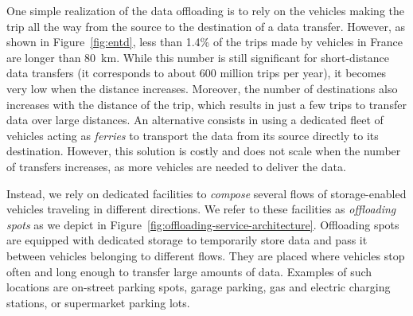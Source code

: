 One simple realization of the data offloading is to rely on the vehicles making the trip all the way from the source to the destination of a data transfer. However, as shown in Figure~\ref{fig:entd}, less than 1.4\% of the trips made by vehicles in France are longer than 80~km. While this number is still significant for short-distance data transfers (it corresponds to about 600 million trips per year), it becomes very low when the distance increases. Moreover, the number of destinations also increases with the distance of the trip, which results in just a few trips to transfer data over large distances. An alternative consists in using a dedicated fleet of vehicles acting as \textit{ferries} to transport the data from its source directly to its destination. However, this solution is costly and does not scale when the number of transfers increases, as more vehicles are needed to deliver the data.

Instead, we rely on dedicated facilities to \textit{compose} several flows of storage-enabled vehicles traveling in different directions. We refer to these facilities as \textit{offloading spots} as we depict in Figure~\ref{fig:offloading-service-architecture}. Offloading spots are equipped with dedicated storage to temporarily store data and pass it between vehicles belonging to different flows. They are placed where vehicles stop often and long enough to transfer large amounts of data. Examples of such locations are on-street parking spots, garage parking, gas and electric charging stations, or supermarket parking lots. 





